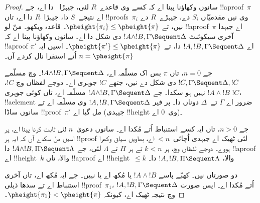\documentclass[../../../include/open-logic-section]{subfiles}
\begin{document}
\begin{proof}
سانوں وکھاؤنا پینا اے کہ کسے وی قاعدے~$R$ لئی، جیہڑا~ دا اے، جے !!a{proof}~$\pi$ اے نتیجے~$S$ دا، جیہڑا~$R$ دا اے، تاں !!{proof}s~$\pi_i$ وی نیں مقدمیّاں $S_i$ دے، جیہڑے~$R$ دے نیں، تے $\pheight{\pi_i}
\le \pheight{\pi}$۔ قاعدہ \LeftR{\land} ویکھو۔ منّ لو !!a{proof}~$\pi$ اے جیہدا آخری سیکوئنٹ $!A \land !B, \Gamma
\Sequent \Delta$ دی شکل دا اے۔ سانوں وکھاؤنا پینا اے کہ !!a{proof} $\pi'$ اے $!A, !B, \Gamma \Sequent \Delta$ دا، تے $\pheight{\pi'} \le
\pheight{\pi}$۔ اسیں ایہ $n = \pheight{\pi}$ اُتے استقرا نال کردے آں۔

جے $n = 0$، تاں $\pi$ بس اک مسلّمہ اے، $!A \land !B, \Gamma
\Sequent \Delta$۔  وچ مسلّمے $!C, \Gamma
\Sequent \Delta, !C$ دی شکل دے نیں، جتھے $!C$ جوہری اے۔ دوجے لفظاں وچ $!C$، $!A \land !B$ نہیں ہو سکدا۔ جے $!A \land !B, \Gamma \Sequent \Delta$ مسلّمہ اے، تاں کوئی جوہری $!C$، !!a{element} ضرور اے $ \Gamma$ تے~$\Delta$ دوناں دا۔ پر فیر $!A, !B, \Gamma \Sequent \Delta$ وی مسلّمہ اے تے سانوں ساڈا !!{proof}~$\pi'$ مل گیا اے (جیہدی !!{height} وی~$0$ اے)۔

جے $n>0$، تاں ایہ کسے استنباط اُتے مُکدا اے۔ سانوں دعویٰ~$n$ لئی ثابت کرنا پینا اے، پر اسیں منّ سکدے آں کہ ایہ ہر !!{proof} لئی ٹھیک اے جیہدی اُچائی~$<n$ اے، بھاویں سیاق وکھرا ہووے۔ دوجے لفظاں وچ، ہر $k<n$ تے ہر $ \Pi$ تے $ \Lambda$ لئی، جے $!A \land !B, \Pi \Sequent \Lambda$ دا !!a{proof} اے !!{height}~$k$ والا، تاں !!a{proof} اے !!{height}~$\le k$ والا، $!A, !B, \Pi \Sequent \Lambda$ دا۔

دو صورتاں نیں۔ کھبّے پاسے $!A \land
!B$ یا مُکھ اے یا نہیں۔ جے ایہ مُکھ اے، تاں آخری استنباط \LeftR{\land} اے تے سدھا ذیلی !!{proof}~$\pi_1$، $!A, !B, \Gamma \Sequent \Delta$ اُتے مُکدا اے۔ ایس صورت وچ نتیجہ ٹھیک اے، کیونکہ $\pheight{\pi_1} < \pheight{\pi}$۔


\end{proof}
\end{document}
